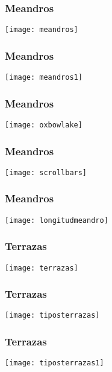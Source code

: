 \documentclass{beamer}
\begin{document}
\begin{frame}
\frametitle{Meandros}
\begin{center}
   	\texttt{[image: meandros]}
\end{center}
\end{frame}
\begin{frame}
\frametitle{Meandros}
\begin{center}
   	\texttt{[image: meandros1]}
\end{center}
\end{frame}
\begin{frame}
\frametitle{Meandros}
\begin{center}
   	\texttt{[image: oxbowlake]}
\end{center}
\end{frame}
\begin{frame}
\frametitle{Meandros}
\begin{center}
   	\texttt{[image: scrollbars]}
\end{center}
\end{frame}
\begin{frame}
\frametitle{Meandros}
\begin{center}
   	\texttt{[image: longitudmeandro]}
\end{center}
\end{frame}
\begin{frame}
\frametitle{Terrazas}
\begin{center}
   	\texttt{[image: terrazas]}
\end{center}
\end{frame}
\begin{frame}
\frametitle{Terrazas}
\begin{center}
   	\texttt{[image: tiposterrazas]}
\end{center}
\end{frame}
\begin{frame}
\frametitle{Terrazas}
\begin{center}
   	\texttt{[image: tiposterrazas1]}
\end{center}
\end{frame}
\end{document}
